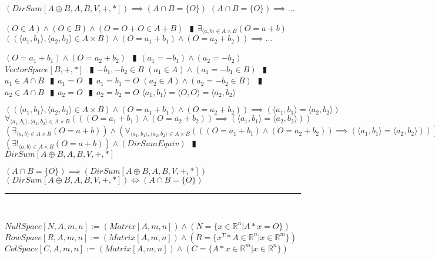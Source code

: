 \documentclass{book}
\newcommand{\abr}{:=}
\newcommand{\pipe}{$\phantom{(}\vrectangleblack\phantom{)}$}
\begin{document}
\begin{shaded}
\begin{enumerate}
    \lit $(DirSum[A \oplus B, A, B, V, +, *]) \implies (A \cap B = \{O\})$
    \lit $(A \cap B = \{O\}) \implies \ldots$
    \begin{enumerate}
      \lit $(O \in A) \land (O \in B) \land (O = O + O \in A + B)$ \pipe $\exists_{\langle a, b \rangle \in A \times B}(O = a + b)$
      \lit $((\langle a_1, b_1 \rangle, \langle a_2, b_2 \rangle \in A \times B) \land (O = a_1 + b_1) \land (O = a_2 + b_2)) \implies \ldots$
      \begin{enumerate}
        \lit $(O = a_1 + b_1) \land (O = a_2 + b_2)$ \pipe $(a_1 = -b_1) \land (a_2 = -b_2)$
        \lit $VectorSpace[B, +, *]$ \pipe $-b_1, -b_2 \in B$
        \lit $(a_1 \in A) \land (a_1 = -b_1 \in B)$ \pipe $a_1 \in A \cap B$ \pipe $a_1 = O$ \pipe $a_1 = b_1 = O$
        \lit $(a_2 \in A) \land (a_2 = -b_2 \in B)$ \pipe $a_2 \in A \cap B$ \pipe $a_2 = O$ \pipe $a_2 = b_2 = O$
        \lit $\langle a_1, b_1 \rangle = \langle O, O \rangle = \langle a_2, b_2 \rangle$
      \end{enumerate}
      \lit $((\langle a_1, b_1 \rangle, \langle a_2, b_2 \rangle \in A \times B) \land (O = a_1 + b_1) \land (O = a_2 + b_2)) \implies (\langle a_1, b_1 \rangle = \langle a_2, b_2 \rangle)$
      \lit $\forall_{\langle a_1, b_1 \rangle, \langle a_2, b_2 \rangle \in A \times B}(((O = a_1 + b_1) \land (O = a_2 + b_2)) \implies (\langle a_1, b_1 \rangle = \langle a_2, b_2 \rangle))$
      \lit $(\exists_{\langle a, b \rangle \in A \times B}(O = a + b)) \land (\forall_{\langle a_1, b_1 \rangle, \langle a_2, b_2 \rangle \in A \times B}(((O = a_1 + b_1) \land (O = a_2 + b_2)) \implies (\langle a_1, b_1 \rangle = \langle a_2, b_2 \rangle)))$
      \lit $(\exists!_{\langle a, b \rangle \in A \times B}(O = a + b)) \land (DirSumEquiv)$ \pipe $DirSum[A \oplus B, A, B, V, +, *]$
    \end{enumerate}
    \lit $(A \cap B = \{O\}) \implies (DirSum[A \oplus B, A, B, V, +, *])$
    \lit $(DirSum[A \oplus B, A, B, V, +, *]) \iff (A \cap B = \{O\})$
  \end{enumerate} \vspace{.75mm} \hrule \vspace{.75mm} \ \\
\end{shaded} %

$NullSpace[N, A, m, n] \abr (Matrix[A, m, n]) \land (N = \{x \in \mathbb{R}^n | A * x = O\})$ \\  %
$RowSpace[R, A, m, n] \abr (Matrix[A, m, n]) \land (R = \{x^T * A \in \mathbb{R}^n | x \in \mathbb{R}^m\})$ \\  %
$ColSpace[C, A, m, n] \abr (Matrix[A, m, n]) \land (C = \{A * x \in \mathbb{R}^m | x \in \mathbb{R}^n\})$ \\  %
\end{document}
